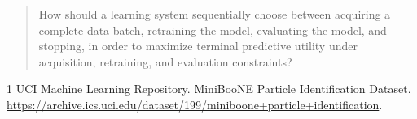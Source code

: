 \documentclass[11pt,letterpaper]{article}
\begin{document}
\begin{quote}
How should a learning system sequentially choose between acquiring a complete
data batch, retraining the model, evaluating the model, and stopping, in order
to maximize terminal predictive utility under acquisition, retraining, and
evaluation constraints?
\end{quote}

\begin{thebibliography}{1}
UCI Machine Learning Repository.
\newblock MiniBooNE Particle Identification Dataset.
\newblock
\url{https://archive.ics.uci.edu/dataset/199/miniboone+particle+identification}.
\end{thebibliography}
\end{document}
